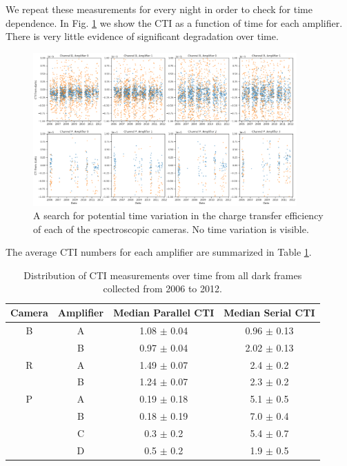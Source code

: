 We repeat these measurements for every night in order to check for time dependence. In Fig. \ref{fig:time_variation} we show the CTI as a function of time for each amplifier. There is very little evidence of significant degradation over time.

\begin{figure}
    \centering
    \includegraphics[width=0.9\textwidth]{figures/cte/time_variation.png}
    \caption{A search for potential time variation in the charge transfer efficiency of each of the spectroscopic cameras. No time variation is visible.}
    \label{fig:time_variation}
\end{figure}

The average CTI numbers for each amplifier are summarized in Table \ref{tab:cte_darks}.
\begin{table}[h!]
    \centering
    \begin{tabular}{|c|c|c|c|}\hline
        Camera & Amplifier & Median Parallel CTI  & Median Serial CTI \\ \hline
        B & A &   1.08 $\pm$ 0.04  &  0.96 $\pm$ 0.13 \\
          & B &   0.97 $\pm$ 0.04  &  2.02 $\pm$ 0.13 \\\hline
        R & A &   1.49 $\pm$ 0.07  &  2.4  $\pm$ 0.2 \\
          & B &   1.24 $\pm$ 0.07  &  2.3  $\pm$ 0.2 \\\hline
        P & A &   0.19 $\pm$ 0.18  &  5.1  $\pm$ 0.5 \\
          & B &   0.18 $\pm$ 0.19  &  7.0  $\pm$ 0.4 \\
          & C &   0.3  $\pm$ 0.2   &  5.4  $\pm$ 0.7 \\
          & D &   0.5  $\pm$ 0.2   &  1.9  $\pm$ 0.5 \\\hline
    \end{tabular}
    \caption{Distribution of CTI measurements over time from all dark frames collected from 2006 to 2012.}
    \label{tab:cte_darks}
\end{table}

